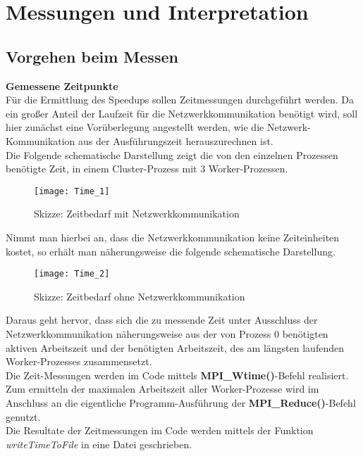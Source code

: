 \documentclass[
10pt, %
a4paper, %
oneside, %
headinclude,footinclude, %
BCOR5mm, %
]{scrartcl}
\begin{document}
\section{Messungen und Interpretation}
\subsection{Vorgehen beim Messen}

\textbf{Gemessene Zeitpunkte}\\
Für die Ermittlung des Speedups sollen Zeitmessungen durchgeführt werden. Da ein großer Anteil der Laufzeit für die Netzwerkkommunikation benötigt wird, soll hier zunächst eine Vorüberlegung angestellt werden, wie die Netzwerk-Kommunikation aus der Ausführungszeit herauszurechnen ist. \\Die Folgende schematische Darstellung zeigt die von den einzelnen Prozessen benötigte Zeit, in einem Cluster-Prozess mit 3 Worker-Prozessen.

\begin{figure}[h]
	\centering 
	\texttt{[image: Time\_1]} 
	\caption[Skizze: Zeitbedarf mit Netzwerkkommunikation]{Skizze: Zeitbedarf mit Netzwerkkommunikation }
	
\end{figure}

Nimmt man hierbei an, dass die Netzwerkkommunikation keine Zeiteinheiten kostet, so erhält man näherungsweise die folgende schematische Darstellung.
\pagebreak

\begin{figure}[h]
	\centering 
	\texttt{[image: Time\_2]} 
	\caption[Skizze: Zeitbedarf ohne Netzwerkkommunikation]{Skizze: Zeitbedarf ohne Netzwerkkommunikation}
	
\end{figure}

Daraus geht hervor, dass sich die zu messende Zeit unter Ausschluss der Netzwerkkommunikation näherungsweise aus der von Prozess 0 benötigten aktiven Arbeitszeit und der benötigten Arbeitszeit, des am längsten laufenden Worker-Prozesses zusammensetzt.\\
Die Zeit-Messungen werden im Code mittels \textbf{MPI\_Wtime()}-Befehl realisiert. Zum ermitteln der maximalen Arbeitszeit aller Worker-Prozesse wird im Anschluss an die eigentliche Programm-Ausführung der \textbf{MPI\_Reduce()}-Befehl genutzt.\\
Die Resultate der Zeitmessungen im Code werden mittels der Funktion \textit{writeTimeToFile} in eine Datei geschrieben.\\
\end{document}
